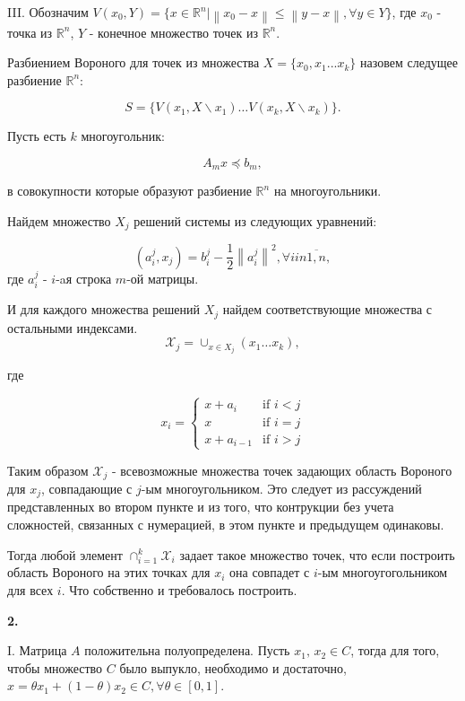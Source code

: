 \documentclass[12pt]{article}
\newcommand\norm[1]{\left\lVert#1\right\rVert}
\begin{document}
III. Обозначим $V(x_0, Y)= \{x\in\mathbb{R}^n|\norm{x_0-x} \leq \norm{y - x},\forall y \in Y\}$, где $x_0$ - точка из $\mathbb{R}^n$, $Y$ - конечное множество точек из $\mathbb{R}^n$.

Разбиением Вороного для точек из множества $X = \{x_0, x_1 ... x_k\}$ назовем следущее разбиение $\mathbb{R}^n$:

$$S = \{V(x_1, X\backslash x_1)\ldots V(x_k, X\backslash x_k)\}.$$

Пусть есть $k$ многоугольник:

$$A_mx \preceq b_m,$$

в совокупности которые образуют разбиение $\mathbb{R}^n$ на многоугольники.

Найдем множество $X_j$ решений системы из следующих уравнений:

$$(a_i^j,x_j) = b_i^j - \frac{1}{2}\norm{a_i^j}^2, \forall i in \overline{1,n},$$
где $a_i^j$ - $i$-aя строка $m$-ой матрицы.

И для каждого множества решений $X_j$ найдем соответствующие множества с остальными индексами. $$\mathcal{X}_j = \cup_{x\in X_j}( x_1\ldots x_k),$$

где

\begin{equation*}
x_i = 
 \begin{cases}
   x+a_i &\text{if  $i<j$}\\
   x &\text{if $i=j$}\\
   x+a_{i-1} &\text{if  $i>j$}
 \end{cases}
\end{equation*}


Таким образом $\mathcal{X}_j$ - всевозможные множества точек задающих область Вороного для $x_j$, совпадающие с $j$-ым многоугольником. Это следует из рассуждений представленных во втором пункте и из того, что контрукции без учета сложностей, связанных с нумерацией, в этом пункте и предыдущем одинаковы.

Тогда любой элемент $\cap_{i=1}^k\mathcal{X}_i$ задает такое множество точек, что если построить область Вороного на этих точках для $x_i$ она совпадет с $i$-ым многоугогольником для всех $i$. Что собственно и требовалось построить.

\begin{center}
	\textbf{2.}
\end{center}

I. Матрица $A$  положительна полуопределена. Пусть $x_1,\,x_2\in C$, тогда для того, чтобы множество $C$ было выпукло, необходимо и достаточно, $x = \theta x_1+(1-\theta)x_2\in C,\forall \theta \in [0,1]$.
\end{document}
